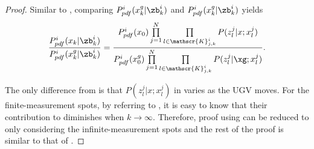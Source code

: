 	\begin{proof}		
		Similar to , comparing $P^i_{pdf}(x^g_k|\zb^i_k)$ and $P^i_{pdf}(x^g_k|\zb^i_k)$ yields		
		\small\begin{equation}\label{eqn:cmp2}
		\frac{P^i_{pdf}(x_k|\zb^i_k)}{P^i_{pdf}(x^g_k|\zb^i_k)}=\frac{P^i_{pdf}(x_0)\prod\limits_{j=1}^{N}\prod\limits_{l\in\mathscr{K}^{i}_{j,k}}P(z^j_l|x;x^j_l)}{P^i_{pdf}(x^g_0)\prod\limits_{j=1}^{N}\prod\limits_{l\in\mathscr{K}^{i}_{j,k}}P(z^j_l|\xg;x^j_l)}.
		\end{equation}\normalsize
			
		The only difference from  is that $P(z^j_l|x;x^j_l)$ in  varies as the UGV moves.
		For the finite-measurement spots, by referring to , it is easy to know that their contribution to  diminishes when $k\rightarrow \infty$.
		Therefore, proof using  can be reduced to only considering the infinite-measurement spots and the rest of the proof is similar to that of .
	\end{proof}
			
